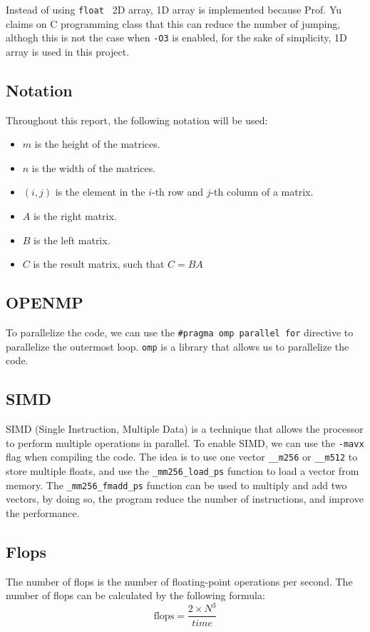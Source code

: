 \documentclass{article}
\begin{document}
Instead of using \texttt{float \* \*} 2D array, 1D array is implemented because Prof. Yu claims on C programming class that this can reduce the number of jumping, althogh this is not the case when \texttt{-O3} is enabled, for the sake of simplicity, 1D array is used in this project.
\subsection{Notation}
Throughout this report, the following notation will be used:
\begin{itemize}
  \item $m$ is the height of the matrices.
  \item $n$ is the width of the matrices.
  \item $(i,j)$ is the element in the $i$-th row and $j$-th column of a matrix.
  \item $A$ is the right matrix.
  \item $B$ is the left matrix.
  \item $C$ is the result matrix, such that $C = BA$
\end{itemize}

\subsection{OPENMP}
To parallelize the code, we can use the \texttt{\#pragma omp parallel for} directive to parallelize the outermost loop. \texttt{omp} is a library that allows us to parallelize the code.

\subsection{SIMD}
SIMD (Single Instruction, Multiple Data) is a technique that allows the processor to perform multiple operations in parallel. To enable SIMD, we can use the \texttt{-mavx} flag when compiling the code. The idea is to use one vector \texttt{\_\_m256} or \texttt{\_\_m512} to store multiple floats, and use the \texttt{\_mm256\_load\_ps} function to load a vector from memory. The \texttt{\_mm256\_fmadd\_ps} function can be used to multiply and add two vectors, by doing so, the program reduce the number of instructions, and improve the performance.

\subsection{Flops}
The number of flops is the number of floating-point operations per second. The number of flops can be calculated by the following formula:
$$ \text{flops} = \frac{2\times N ^ 3}{time} $$
\end{document}
